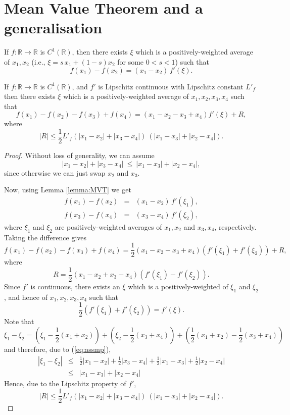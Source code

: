 \documentclass[review]{siamart190516}
\def \RR {{\mathbb{R}}}
\newcommand{\fracs}[2]{{\textstyle \frac{#1}{#2}}}
\begin{document}



\appendix

\newpage
\section{Mean Value Theorem and a generalisation}

\begin{lemma}
\label{lemma:MVT}
If $f: \RR \rightarrow \RR$ is $C^1(\RR)$, then there exists 
$\xi$ which is a positively-weighted average of $x_1, x_2$
(i.e., $\xi = s\, x_1 + (1{-}s) x_2$ for some $0\!<\!s\!<\!1$)
such that
\[
f(x_1) - f(x_2) = (x_1{-}x_2) \, f'(\xi).
\]
\end{lemma}

\begin{lemma}
\label{lemma:MVT2}
If $f: \RR \rightarrow \RR$ is $C^1(\RR)$, and $f'$ is Lipschitz 
continuous with Lipschitz constant $L'_f$ then there exists $\xi$ 
which is a positively-weighted average of $x_1, x_2, x_3, x_4$ such
that
\[
f(x_1) - f(x_2) - f(x_3) + f(x_4) = 
(x_1 - x_2 - x_3 + x_4) f'(\xi) + R,
\]
where
\[
|R| \leq \fracs{1}{2} L'_f (|x_1{-}x_2| + |x_3{-}x_4|)\ (|x_1{-}x_3| + |x_2{-}x_4|).
\]
\end{lemma}
\begin{proof}
Without loss of generality, we can assume 
\begin{equation}
|x_1{-}x_2| + |x_3{-}x_4|\ \leq\ |x_1{-}x_3| + |x_2{-}x_4|,
\label{eq:assmp}
\end{equation}
since otherwise we can just swap $x_2$ and $x_3$.

Now, using Lemma \ref{lemma:MVT} we get
\begin{eqnarray*}
f(x_1) - f(x_2) &{=}& (x_1{-}x_2) \, f'(\xi_1),\\
f(x_3) - f(x_4) &{=}& (x_3{-}x_4) \, f'(\xi_2),
\end{eqnarray*}
where $\xi_1$ and $\xi_2$ are positively-weighted averages 
of $x_1, x_2$ and $x_3, x_4$, respectively.
Taking the difference gives
\[
f(x_1) - f(x_2) - f(x_3) + f(x_4) = 
  \fracs{1}{2} (x_1 {-} x_2 {-} x_3 {+} x_4)  (f'(\xi_1) {+} f'(\xi_2)) + R,
\]
where
\[
R = \fracs{1}{2} (x_1 {-} x_2 {+} x_3 {-} x_4)  (f'(\xi_1) {-} f'(\xi_2)).
\]
Since $f'$ is continuous, there exists an $\xi$ which is a positively-weighted
of $\xi_1$ and $\xi_2$, and hence of $x_1, x_2, x_3, x_4$ such that
\[
\fracs{1}{2}  (f'(\xi_1) + f'(\xi_2)) = f'(\xi).
\]
Note that
\[
\xi_1 - \xi_2 = (\xi_1 - \fracs{1}{2}(x_1+x_2)) + (\xi_2 - \fracs{1}{2}(x_3+x_4))
+ ( \fracs{1}{2}(x_1+x_2) - \fracs{1}{2}(x_3+x_4) )
\]
and therefore, due to (\ref{eq:assmp}),
\begin{eqnarray*}
| \xi_1 - \xi_2 | 
&\leq& \fracs{1}{2}|x_1-x_2| + \fracs{1}{2}|x_3-x_4| + \fracs{1}{2}|x_1-x_3| + \fracs{1}{2}|x_2-x_4|\\
&\leq& |x_1-x_3| + |x_2-x_4|
\end{eqnarray*}
Hence, due to the Lipschitz property of $f'$, 
\[
|R| \leq \fracs{1}{2} L'_f (|x_1{-}x_2| + |x_3{-}x_4|)\ (|x_1{-}x_3| + |x_2{-}x_4|).
\]
\end{proof}
\end{document}
